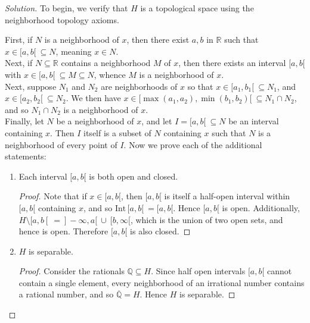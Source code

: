 \documentclass[12pt]{article}
\newcommand{\Int}[1]{\text{Int}\,#1}
\newenvironment{solution}
  {\renewcommand\qedsymbol{$\blacksquare$}\begin{proof}[Solution]}
{\end{proof}}
\newenvironment{sproof}{
  \renewcommand\qedsymbol{$\square$}
  \begin{proof}
  }{
  \end{proof}
}
\begin{document}
\begin{solution}
  To begin, we verify that $H$ is a topological space using the neighborhood topology axioms.

  \indent First, if $N$ is a neighborhood of $x$, then there exist $a,b$ in $\mathbb{R}$
  such that $x\in[a,b[\ \subseteq N$, meaning $x\in N$. \\
  \indent Next, if $N\subseteq\mathbb{R}$ contains a neighborhood $M$ of $x$, then
  there exists an interval $[a,b[$ with $x\in[a,b[\ \subseteq M\subseteq N$, whence
  $M$ is a neighborhood of $x$. \\
  \indent Next, suppose $N_1$ and $N_2$ are neighborhoods of $x$ so that 
  $x\in[a_1,b_1[\ \subseteq N_1$, and $x\in[a_2,b_2[\ \subseteq N_2$.
  We then have $x\in[\max(a_1,a_2),\min(b_1,b_2)[\ \subseteq{N_1\cap N_2}$, and so
  $N_1\cap N_2$ is a neighborhood of $x$. \\
  \indent Finally, let $N$ be a neighborhood of $x$, and let $I=[a,b[\ \subseteq N$ be
      an interval containing $x$.
      Then $I$ itself is a subset of $N$ containing $x$ such that $N$ is a 
      neighborhood of every point of $I$.
  Now we prove each of the additional statements:
  \begin{enumerate}
    \item Each interval $[a,b[$ is both open and closed.
          \begin{sproof}
            Note that if $x\in [a,b[$, then $[a,b[$ is itself a half-open interval 
            within $[a,b[$ containing $x$, and so $\Int[a,b[\ =[a,b[$.
            Hence $[a,b[$ is open.
            Additionally, $H\setminus[a,b[\ = ]-\infty, a[\ \cup\ [b, \infty[$, which is
            the union of two open sets, and hence is open.
            Therefore $[a,b[$ is also closed.
          \end{sproof}
    \item $H$ is separable.
    \begin{sproof}
        Consider the rationals $\mathbb{Q}\subseteq H$.
        Since half open intervals $[a,b[$ cannot contain a single element, every neighborhood of
        an irrational number contains a rational number, and so $\overline{\mathbb{Q}} =  H$.
        Hence $H$ is separable.
    \end{sproof}
  \end{enumerate}


\end{solution}
\end{document}
